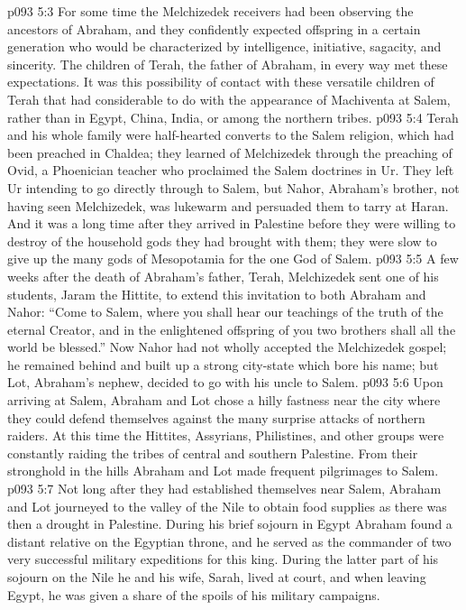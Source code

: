 \vs p093 5:3 For some time the Melchizedek receivers had been observing the ancestors of Abraham, and they confidently expected offspring in a certain generation who would be characterized by intelligence, initiative, sagacity, and sincerity. The children of Terah, the father of Abraham, in every way met these expectations. It was this possibility of contact with these versatile children of Terah that had considerable to do with the appearance of Machiventa at Salem, rather than in Egypt, China, India, or among the northern tribes.
\vs p093 5:4 Terah and his whole family were half\hyp{}hearted converts to the Salem religion, which had been preached in Chaldea; they learned of Melchizedek through the preaching of Ovid, a Phoenician teacher who proclaimed the Salem doctrines in Ur. They left Ur intending to go directly through to Salem, but Nahor, Abraham’s brother, not having seen Melchizedek, was lukewarm and persuaded them to tarry at Haran. And it was a long time after they arrived in Palestine before they were willing to destroy  of the household gods they had brought with them; they were slow to give up the many gods of Mesopotamia for the one God of Salem.
\vs p093 5:5 A few weeks after the death of Abraham’s father, Terah, Melchizedek sent one of his students, Jaram the Hittite, to extend this invitation to both Abraham and Nahor: “Come to Salem, where you shall hear our teachings of the truth of the eternal Creator, and in the enlightened offspring of you two brothers shall all the world be blessed.” Now Nahor had not wholly accepted the Melchizedek gospel; he remained behind and built up a strong city\hyp{}state which bore his name; but Lot, Abraham’s nephew, decided to go with his uncle to Salem.
\vs p093 5:6 Upon arriving at Salem, Abraham and Lot chose a hilly fastness near the city where they could defend themselves against the many surprise attacks of northern raiders. At this time the Hittites, Assyrians, Philistines, and other groups were constantly raiding the tribes of central and southern Palestine. From their stronghold in the hills Abraham and Lot made frequent pilgrimages to Salem.
\vs p093 5:7 \pc Not long after they had established themselves near Salem, Abraham and Lot journeyed to the valley of the Nile to obtain food supplies as there was then a drought in Palestine. During his brief sojourn in Egypt Abraham found a distant relative on the Egyptian throne, and he served as the commander of two very successful military expeditions for this king. During the latter part of his sojourn on the Nile he and his wife, Sarah, lived at court, and when leaving Egypt, he was given a share of the spoils of his military campaigns.
